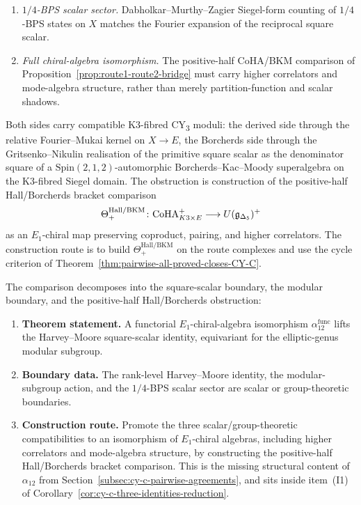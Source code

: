 \begin{theorem}
\begin{enumerate}[label=\textup{(E\arabic*)}]
 \item \emph{$1/4$-BPS scalar sector.} Dabholkar--Murthy--Zagier Siegel-form counting of \(1/4\)-BPS states on \(X\) matches the Fourier expansion of the reciprocal square scalar.
 \item \emph{Full chiral-algebra isomorphism.} The positive-half CoHA/BKM comparison of Proposition~\ref{prop:route1-route2-bridge} must carry higher correlators and mode-algebra structure, rather than merely partition-function and scalar shadows.
\end{enumerate}
Both sides carry compatible K3-fibred CY\textsubscript{3} moduli: the derived side through the relative Fourier--Mukai kernel on $X \to E$, the Borcherds side through the Gritsenko--Nikulin realisation of the primitive square scalar as the denominator square of a $\mathrm{Spin}(2, 1, 2)$-automorphic Borcherds--Kac--Moody superalgebra on the K3-fibred Siegel domain. The obstruction is construction of the positive-half Hall/Borcherds bracket comparison
\[
 \Theta_{+}^{\mathrm{Hall/BKM}}\colon
 \mathrm{CoHA}^+_{K3\times E}\longrightarrow U(\mathfrak g_{\Delta_5})^+
\]
as an \(E_1\)-chiral map preserving coproduct, pairing, and higher
correlators. The construction route is to build
\(\Theta_{+}^{\mathrm{Hall/BKM}}\) on the route complexes and use the
cycle criterion of Theorem~\ref{thm:pairwise-all-proved-closes-CY-C}.
\end{theorem}

\begin{remark}
\label{rem:conj-harvey-moore-functorial-triple}
The comparison decomposes into the square-scalar boundary, the modular
boundary, and the positive-half Hall/Borcherds obstruction:
\begin{enumerate}[label=\textup{(\alph*)}]
 \item \textbf{Theorem statement.} A functorial $E_1$-chiral-algebra isomorphism $\alpha_{12}^{\mathrm{func}}$ lifts the Harvey--Moore square-scalar identity, equivariant for the elliptic-genus modular subgroup.
 \item \textbf{Boundary data.} The rank-level Harvey--Moore identity, the modular-subgroup action, and the \(1/4\)-BPS scalar sector are scalar or group-theoretic boundaries.
 \item \textbf{Construction route.} Promote the three scalar/group-theoretic compatibilities to an isomorphism of $E_1$-chiral algebras, including higher correlators and mode-algebra structure, by constructing the positive-half Hall/Borcherds bracket comparison. This is the missing structural content of $\alpha_{12}$ from Section~\ref{subsec:cy-c-pairwise-agreements}, and sits inside item~(I1) of Corollary~\ref{cor:cy-c-three-identities-reduction}.
\end{enumerate}
\end{remark}

